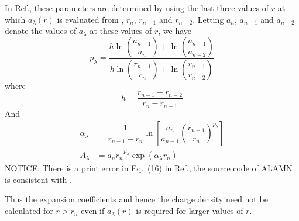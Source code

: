 \documentclass[aps,pra,groupedaddress,
                amsfonts,amssymb,
                preprint
    ]{revtex4}
\begin{document}
In Ref.\cite{MAM1980}, these parameters are determined by using the
last three values of $r$ at which $a_\lambda(r)$ is evaluated from
, $r_n$, $r_{n-1}$ and $r_{n-2}$. Letting $a_n$, $a_{n-1}$ and
$a_{n-2}$ denote the values of $a_\lambda$ at these values of $r$, we
have
\begin{equation}
  \label{eq:plam}
  p_\lambda = \dfrac{h\ln\left(\dfrac{a_{n-1}}{a_n}\right) +
                      \ln\left(\dfrac{a_{n-1}}{a_{n-2}}\right)}
                    {h\ln\left(\dfrac{r_{n-1}}{r_n}\right) +
                      \ln\left(\dfrac{r_{n-1}}{r_{n-2}}\right)} 
\end{equation}
where
\begin{equation}
   h = \dfrac{r_{n-1} - r_{n-2}}{r_n - r_{n-1}}
 \end{equation}
And
\begin{align}
  \label{eq:alphlam}
  \alpha_\lambda &= \dfrac{1}{r_{n-1} - r_n}
                    \ln\left[\dfrac{a_n}{a_{n-1}}
                       \left(\dfrac{r_{n-1}}{r_n}\right)^{p_\lambda}\right] \\
  \label{eq:Alam}
  A_\lambda & = a_nr_n^{-p_\lambda}\exp(\alpha_\lambda r_n)
\end{align}
NOTICE: There is a print error in Eq.~(16) in Ref.\cite{MAM1980},
the source code of ALAMN is consistent with .

Thus the expansion coefficients and hence the charge density need not be
calculated for $r > r_n$ even if $a_\lambda(r)$ is required for larger
values of $r$.
\end{document}
